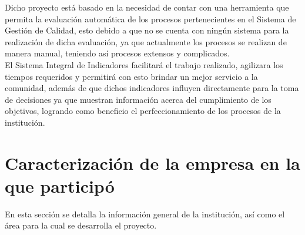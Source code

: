 Dicho proyecto est\'a basado en la necesidad de contar con una herramienta que permita la evaluaci\'on autom\'atica de los procesos pertenecientes en el Sistema de Gesti\'on de Calidad, esto debido a que no se cuenta con ning\'un sistema para la realizaci\'on de dicha evaluaci\'on, ya que actualmente los procesos se realizan de manera manual, teniendo as\'i procesos extensos y complicados.\\

El Sistema Integral de Indicadores facilitar\'a el trabajo realizado, agilizara los tiempos requeridos y permitir\'a con esto brindar un mejor servicio a la comunidad, adem\'as de que dichos indicadores influyen directamente para la toma de decisiones ya que muestran informaci\'on acerca del cumplimiento de los objetivos, logrando como beneficio el perfeccionamiento de los procesos de la instituci\'on.


\section{Caracterizaci\'on de la empresa en la que particip\'o}
En esta secci\'on se detalla la informaci\'on general de la instituci\'on, as\'i como el \'area para la cual se desarrolla el proyecto.

